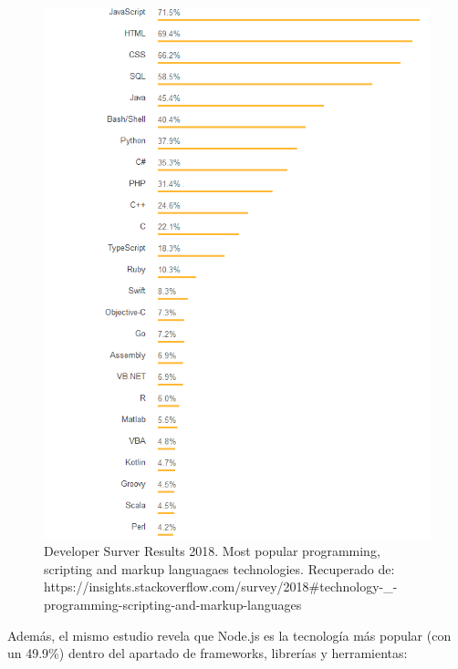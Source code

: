 \begin{figure}[H]
\centering
\includegraphics[width=5.00in]{images/tecnologias_populares.png}
\caption{Developer Surver Results 2018. Most popular programming, scripting and markup languagaes technologies.
 Recuperado de: https://insights.stackoverflow.com/survey/2018\#technology-\_-programming-scripting-and-markup-languages}
\label{fig:tecnologias_populares}
\end{figure}

\newpage
Además, el mismo estudio revela que Node.js es la tecnología más popular (con un 49.9\%) dentro del apartado de frameworks, librerías y herramientas:

